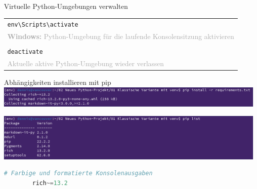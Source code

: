 {\begin{frame}[fragile]{Virtuelle Python-Umgebungen verwalten}
{\begin{tabular}{|p{}|}
        \cellcolor{gray!15}
        \texttt{env\textbackslash Scripts\textbackslash activate} \\
        \cellcolor{gray!15}
        \textcolor{darkgray}{\textbf{Windows:} Python-Umgebung für die laufende Konsolensitzung aktivieren} \\

        \cellcolor{gray!7}
        \\

        \cellcolor{gray!15}
        \texttt{deactivate} \\
        \cellcolor{gray!15}
        \textcolor{darkgray}{Aktuelle aktive Python-Umgebung wieder verlassen} \\

        \hline
    \end{tabular}
    }

    \medskip
\end{frame}

{
\tiny

\begin{frame}[fragile]{Abhängigkeiten installieren mit pip}
    \includegraphics[width=\textwidth]{img/pip-install}

    \includegraphics[width=\textwidth]{img/pip-list}


    \begin{lstlisting}[language=Python, gobble=8]
        # Farbige und formatierte Konsolenausgaben
        rich~=13.2
    \end{lstlisting}


\end{frame}}}
